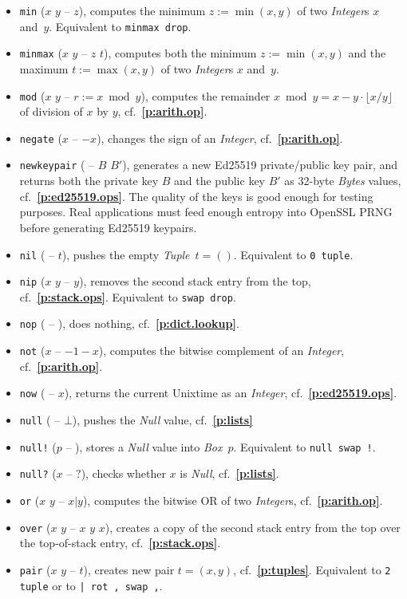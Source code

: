 \documentclass[12pt,oneside]{article}
\def\refpoint#1{{\rm\textbf{\ref{#1}}}}
\let\ptref=\refpoint
\begin{document}
\begin{itemize}
\item {\tt min} ($x$ $y$ -- $z$), computes the minimum $z:=\min(x,y)$ of two {\em Integer\/}s $x$ and~$y$. Equivalent to {\tt minmax drop}.
\item {\tt minmax} ($x$ $y$ -- $z$ $t$), computes both the minimum $z:=\min(x,y)$ and the maximum $t:=\max(x,y)$ of two {\em Integer\/}s $x$ and~$y$.
\item {\tt mod} ($x$ $y$ -- $r:=x\bmod y$), computes the remainder $x\bmod y=x-y\cdot\lfloor x/y\rfloor$ of division of $x$ by $y$, cf.~\ptref{p:arith.op}.
\item {\tt negate} ($x$ -- $-x$), changes the sign of an {\em Integer}, cf.~\ptref{p:arith.op}.
\item {\tt newkeypair} ( -- $B$ $B'$), generates a new Ed25519 private/public key pair, and returns both the private key $B$ and the public key $B'$ as 32-byte {\em Bytes\/} values, cf.~\ptref{p:ed25519.ops}. The quality of the keys is good enough for testing purposes. Real applications must feed enough entropy into OpenSSL PRNG before generating Ed25519 keypairs.
\item {\tt nil} ( -- $t$), pushes the empty {\em Tuple\/}~$t=()$. Equivalent to {\tt 0 tuple}.
\item {\tt nip} ($x$ $y$ -- $y$), removes the second stack entry from the top, cf.~\ptref{p:stack.ops}. Equivalent to {\tt swap drop}.
\item {\tt nop} ( -- ), does nothing, cf.~\ptref{p:dict.lookup}.
\item {\tt not} ($x$ -- $-1-x$), computes the bitwise complement of an {\em Integer}, cf.~\ptref{p:arith.op}.
\item {\tt now} ( -- $x$), returns the current Unixtime as an {\em Integer}, cf.~\ptref{p:ed25519.ops}.
\item {\tt null} ( -- $\bot$), pushes the {\em Null\/} value, cf.~\ptref{p:lists}
\item {\tt null!} ($p$ -- ), stores a {\em Null\/} value into {\em Box\/}~$p$. Equivalent to {\tt null swap !}.
\item {\tt null?} ($x$ -- $?$), checks whether $x$ is {\em Null}, cf.~\ptref{p:lists}.
\item {\tt or} ($x$ $y$ -- $x|y$), computes the bitwise OR of two {\em Integer\/}s, cf.~\ptref{p:arith.op}.
\item {\tt over} ($x$ $y$ -- $x$ $y$ $x$), creates a copy of the second stack entry from the top over the top-of-stack entry, cf.~\ptref{p:stack.ops}.
\item {\tt pair} ($x$ $y$ -- $t$), creates new pair $t=(x,y)$, cf.~\ptref{p:tuples}. Equivalent to {\tt 2 tuple} or to {\tt | rot , swap ,}.

\end{itemize}
\end{document}
